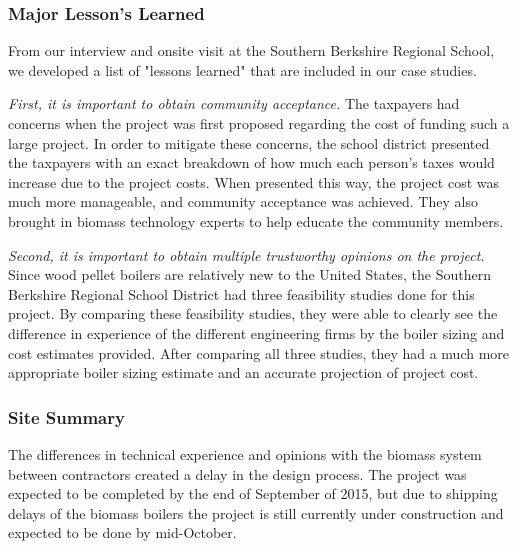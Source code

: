 \subsubsection{Major Lesson's Learned}
\par From our interview and onsite visit at the Southern Berkshire Regional School, we developed a list of "lessons learned" that are included in our case studies.
\par \emph{First, it is important to obtain community acceptance.} The taxpayers had concerns when the project was first proposed regarding the cost of funding such a large project. In order to mitigate these concerns, the school district presented the taxpayers with an exact breakdown of how much each person's taxes would increase due to the project costs. When presented this way, the project cost was much more manageable, and community acceptance was achieved. They also brought in biomass technology experts to help educate the community members.

\par \emph{Second, it is important to obtain multiple trustworthy opinions on the project.} Since wood pellet boilers are relatively new to the United States, the Southern Berkshire Regional School District had three feasibility studies done for this project. By comparing these feasibility studies, they were able to clearly see the difference in experience of the different engineering firms by the boiler sizing and cost estimates provided. After comparing all three studies, they had a much more appropriate boiler sizing estimate and an accurate projection of project cost. 

\subsubsection{Site Summary}
\par The differences in technical experience and opinions with the biomass system between contractors created a delay in the design process. The project was expected to be completed by the end of September of 2015, but due to shipping delays of the biomass boilers the project is still currently under construction and expected to be done by mid-October.

